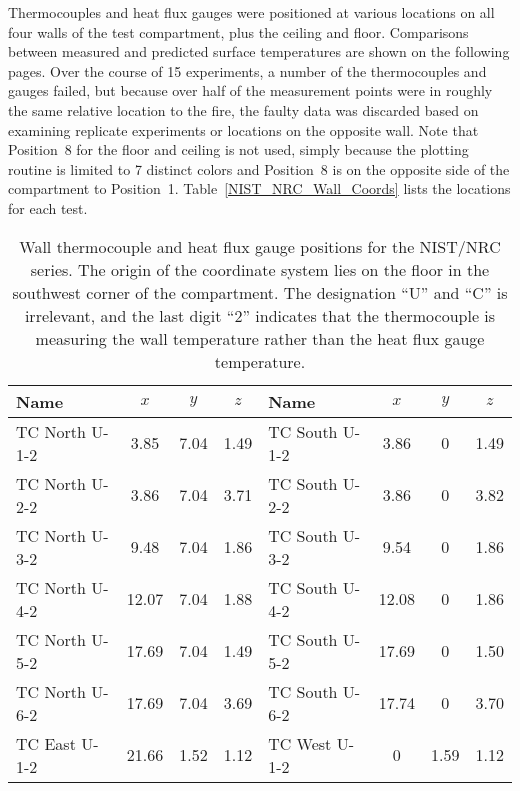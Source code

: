 Thermocouples and heat flux gauges were positioned at various locations on all four walls of the test compartment, plus the ceiling and floor. Comparisons between measured and predicted surface temperatures are shown on the following pages. Over the course of 15 experiments, a number of the thermocouples and gauges failed, but because over half of the measurement points were in roughly the same relative location to the fire, the faulty data was discarded based on examining replicate experiments or locations on the opposite wall. Note that Position~8 for the floor and ceiling is not used, simply because the plotting routine is limited to 7 distinct colors and Position~8 is on the opposite side of the compartment to Position~1. Table~\ref{NIST_NRC_Wall_Coords} lists the locations for each test.

\begin{table}[ht]
\caption[Wall measurement positions for the NIST/NRC series]
{Wall thermocouple and heat flux gauge positions for the NIST/NRC series. The origin of the coordinate system lies on the floor in the southwest
corner of the compartment. The designation ``U'' and ``C'' is irrelevant, and the last digit ``2'' indicates that the thermocouple is measuring the wall temperature rather than the heat flux gauge temperature.}
\begin{center}
\begin{tabular}{|l|c|c|c||l|c|c|c|}
\hline
Name              & $x$   & $y$  & $z$      & Name              & $x$   & $y$   & $z$       \\ \hline \hline
TC North U-1-2    & 3.85  & 7.04 & 1.49     & TC South U-1-2    & 3.86  & 0     & 1.49      \\ \hline
TC North U-2-2    & 3.86  & 7.04 & 3.71     & TC South U-2-2    & 3.86  & 0     & 3.82      \\ \hline
TC North U-3-2    & 9.48  & 7.04 & 1.86     & TC South U-3-2    & 9.54  & 0     & 1.86      \\ \hline
TC North U-4-2    & 12.07 & 7.04 & 1.88     & TC South U-4-2    & 12.08 & 0     & 1.86      \\ \hline
TC North U-5-2    & 17.69 & 7.04 & 1.49     & TC South U-5-2    & 17.69 & 0     & 1.50      \\ \hline
TC North U-6-2    & 17.69 & 7.04 & 3.69     & TC South U-6-2    & 17.74 & 0     & 3.70      \\ \hline \hline
TC East U-1-2     & 21.66 & 1.52 & 1.12     & TC West U-1-2     & 0     & 1.59  & 1.12      \\ \hline

\end{tabular}
\end{center}
\end{table}

